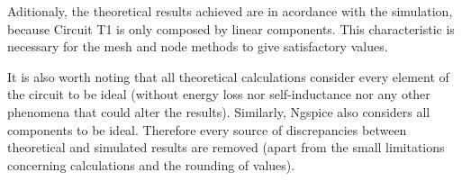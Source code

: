Aditionaly, the theoretical results achieved are in acordance with the simulation, because
Circuit T1 is only composed by linear components. This characteristic is necessary for the mesh and
node methods to give satisfactory values. 

It is also worth noting that all theoretical calculations consider every element of the
circuit to be ideal (without energy loss nor self-inductance nor any other phenomena that could
alter the results). Similarly, Ngspice also considers all components to be ideal. Therefore
every source of discrepancies between theoretical and simulated results are removed (apart from
the small limitations concerning calculations and the rounding of values).


